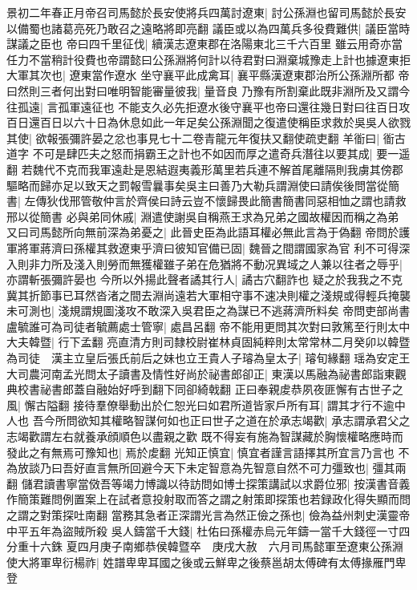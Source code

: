 景初二年春正月帝召司馬懿於長安使將兵四萬討遼東|{
	討公孫淵也留司馬懿於長安以備蜀也諸葛亮死乃敢召之遠略將即亮翻}
議臣或以為四萬兵多役費難供|{
	議臣當時謀議之臣也}
帝曰四千里征伐|{
	續漢志遼東郡在洛陽東北三千六百里}
雖云用奇亦當任力不當稍計役費也帝謂懿曰公孫淵將何計以待君對曰淵棄城豫走上計也據遼東拒大軍其次也|{
	遼東當作遼水}
坐守襄平此成禽耳|{
	襄平縣漢遼東郡治所公孫淵所都}
帝曰然則三者何出對曰唯明智能審量彼我|{
	量音良}
乃豫有所割棄此既非淵所及又謂今往孤遠|{
	言孤軍遠征也}
不能支久必先拒遼水後守襄平也帝曰還往幾日對曰往百日攻百日還百日以六十日為休息如此一年足矣公孫淵聞之復遣使稱臣求救於吳吳人欲戮其使|{
	欲報張彌許晏之忿也事見七十二卷青龍元年復扶又翻使疏吏翻}
羊衜曰|{
	衜古道字}
不可是肆匹夫之怒而捐霸王之計也不如因而厚之遣奇兵潛往以要其成|{
	要一遥翻}
若魏代不克而我軍遠赴是恩結遐夷義形萬里若兵連不解首尾離隔則我虜其傍郡驅略而歸亦足以致天之罰報雪曩事矣吳主曰善乃大勒兵謂淵使曰請俟後問當從簡書|{
	左傳狄伐邢管敬仲言於齊侯曰詩云豈不懷歸畏此簡書簡書同惡相恤之謂也請救邢以從簡書}
必與弟同休戚|{
	淵遣使謝吳自稱燕王求為兄弟之國故權因而稱之為弟}
又曰司馬懿所向無前深為弟憂之|{
	此晉史臣為此語耳權必無此言為于偽翻}
帝問於護軍將軍蔣濟曰孫權其救遼東乎濟曰彼知官備已固|{
	魏晉之間謂國家為官}
利不可得深入則非力所及淺入則勞而無獲權雖子弟在危猶將不動况異域之人兼以往者之辱乎|{
	亦謂斬張彌許晏也}
今所以外揚此聲者譎其行人|{
	譎古穴翻詐也}
疑之於我我之不克冀其折節事已耳然沓渚之間去淵尚遠若大軍相守事不速决則權之淺規或得輕兵掩襲未可測也|{
	淺規謂規圖淺攻不敢深入吳君臣之為謀已不逃蔣濟所料矣}
帝問吏部尚書盧毓誰可為司徒者毓薦處士管寧|{
	處昌呂翻}
帝不能用更問其次對曰敦篤至行則太中大夫韓暨|{
	行下孟翻}
亮直清方則司隸校尉崔林貞固純粹則太常常林二月癸卯以韓暨為司徒　漢主立皇后張氏前后之妹也立王貴人子璿為皇太子|{
	璿旬緣翻}
瑶為安定王大司農河南孟光問太子讀書及情性好尚於祕書郎卻正|{
	東漢以馬融為祕書郎詣東觀典校書祕書郎蓋自融始好呼到翻下同卻綺戟翻}
正曰奉親䖍恭夙夜匪懈有古世子之風|{
	懈古隘翻}
接待羣僚舉動出於仁恕光曰如君所道皆家戶所有耳|{
	謂其才行不逾中人也}
吾今所問欲知其權略智謀何如也正曰世子之道在於承志竭歡|{
	承志謂承君父之志竭歡謂左右就養承顔順色以盡親之歡}
既不得妄有施為智謀藏於胸懷權略應時而發此之有無焉可豫知也|{
	焉於䖍翻}
光知正慎宜|{
	慎宜者謹言語擇其所宜言乃言也}
不為放談乃曰吾好直言無所回避今天下未定智意為先智意自然不可力彊致也|{
	彊其兩翻}
儲君讀書寧當傚吾等竭力博識以待訪問如博士探策講試以求爵位邪|{
	按漢書音義作簡策難問例置案上在試者意投射取而答之謂之射策即探策也若録政化得失顯而問之謂之對策探吐南翻}
當務其急者正深謂光言為然正儉之孫也|{
	儉為益州刺史漢靈帝中平五年為盜賊所殺}
吳人鑄當千大錢|{
	杜佑曰孫權赤烏元年鑄一當千大錢徑一寸四分重十六銖}
夏四月庚子南鄉恭侯韓暨卒　庚戌大赦　六月司馬懿軍至遼東公孫淵使大將軍卑衍楊祚|{
	姓譜卑卑耳國之後或云鮮卑之後蔡邕胡太傅碑有太傅掾雁門卑登}
